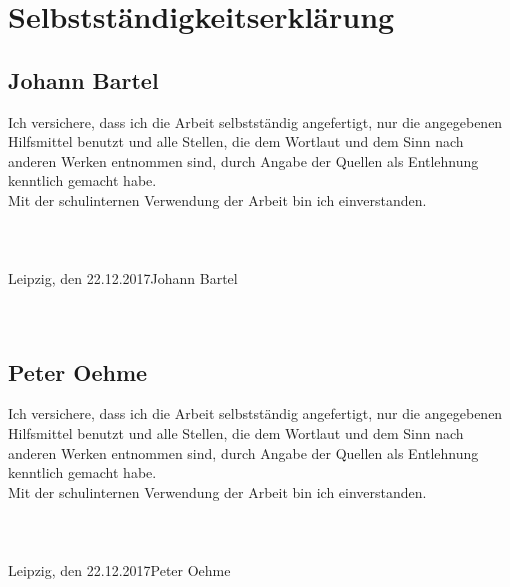 \chapter*{Selbstständigkeitserklärung}
\section*{Johann Bartel}
Ich versichere, dass ich die Arbeit selbstständig angefertigt, nur die angegebenen Hilfsmittel benutzt und alle Stellen, die dem Wortlaut und dem Sinn nach anderen Werken entnommen sind, durch Angabe der Quellen als Entlehnung kenntlich gemacht habe.\\
Mit der schulinternen Verwendung der Arbeit bin ich einverstanden.\\\\\\\\
Leipzig, den 22.12.2017\tab \tab Johann Bartel \\\\\\

\section*{Peter Oehme}
Ich versichere, dass ich die Arbeit selbstständig angefertigt, nur die angegebenen Hilfsmittel benutzt und alle Stellen, die dem Wortlaut und dem Sinn nach anderen Werken entnommen sind, durch Angabe der Quellen als Entlehnung kenntlich gemacht habe.\\
Mit der schulinternen Verwendung der Arbeit bin ich einverstanden.\\\\\\\\
Leipzig, den 22.12.2017\tab \tab Peter Oehme
